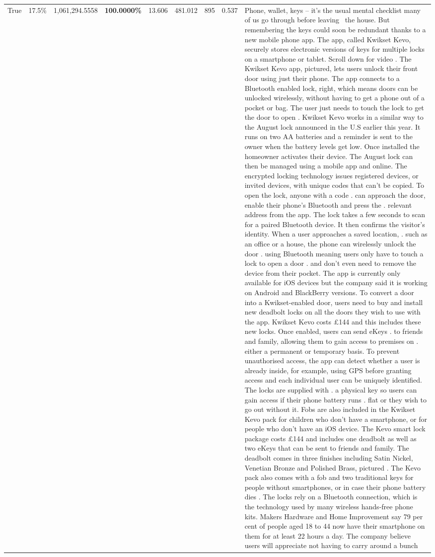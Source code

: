 \begin{table}[H]
\begin{tabular}{lllrlllll}
True & 17.5\% & 1,061,294.5558 & \bfseries \color{red} 100.0000\% & 13.606 & 481.012 & 895 & 0.537 & Phone, wallet, keys – it’s the usual mental checklist many of us go through before leaving  the house. But remembering the keys could soon be redundant thanks to a new mobile phone app. The app, called Kwikset Kevo, securely stores electronic versions of keys for multiple locks on a smartphone or tablet. Scroll down for video . The Kwikset Kevo app, pictured, lets users unlock their front door using just their phone. The app connects to a Bluetooth enabled lock, right, which means doors can be unlocked wirelessly, without having to get a phone out of a pocket or bag. The user just needs to touch the lock to get the door to open . Kwikset Kevo works in a similar way to the August lock announced in the U.S earlier this year. It runs on two AA batteries and a reminder is sent to the owner when the battery levels get low. Once installed the homeowner activates their device. The August lock can then be managed using a mobile app and online. The encrypted locking technology issues registered devices, or invited devices, with unique codes that can't be copied. To open the lock, anyone with a code . can approach the door, enable their phone's Bluetooth and press the . relevant address from the app. The lock takes a few seconds to scan for a paired Bluetooth device. It then confirms the visitor's identity. When a user approaches a saved location, . such as an office or a house, the phone can wirelessly unlock the door . using Bluetooth meaning users only have to touch a lock to open a door . and don't even need to remove the device from their pocket. The app is currently only available for iOS devices but the company said it is working on Android and BlackBerry versions. To convert a door into a Kwikset-enabled door, users need to buy and install new deadbolt locks on all the doors they wish to use with the app. Kwikset Kevo costs £144 and this includes these new locks. Once enabled, users can send eKeys . to friends and family, allowing them to gain access to premises on . either a permanent or temporary basis. To prevent unauthorised access, the app can detect whether a user is already inside, for example, using GPS before granting access and each individual user can be uniquely identified. The locks are supplied with . a physical key so users can gain access if their phone battery runs . flat or they wish to go out without it. Fobs are also included in the Kwikset Kevo pack for children who don't have a smartphone, or for people who don't have an iOS device. The Kevo smart lock package costs £144 and includes one deadbolt as well as two eKeys that can be sent to friends and family. The deadbolt comes in three finishes including Satin Nickel, Venetian Bronze and Polished Brass, pictured . The Kevo pack also comes with a fob and two traditional keys for people without smartphones, or in case their phone battery dies . The locks rely on a Bluetooth connection, which is the technology used by many wireless hands-free phone kits. Makers Hardware and Home Improvement say 79 per cent of people aged 18 to 44 now have their smartphone on them for at least 22 hours a day. The company believe users will appreciate not having to carry around a bunch 
\end{tabular}
\end{table}
